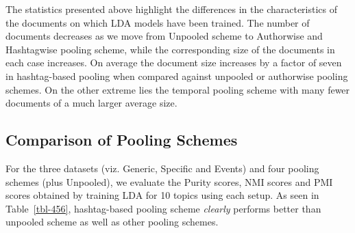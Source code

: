 \documentclass{sig-alternate}
\newcommand{\secmoveup}{\vspace{-1.mm}}
\begin{document}
The statistics presented above highlight the differences in the
characteristics of the documents on which LDA models have been
trained. The number of documents decreases as we move from Unpooled
scheme to Authorwise and Hashtagwise pooling scheme, while the
corresponding size of the documents in each case increases. On 
average the document size increases by a factor of seven in
hashtag-based pooling when compared against unpooled or authorwise
pooling schemes. On the other extreme lies the temporal pooling scheme
with many fewer documents of a much larger average size.

\secmoveup
\subsection{Comparison of Pooling Schemes}

For the three datasets (viz. Generic, Specific and Events) and four pooling
schemes (plus Unpooled), we evaluate the Purity scores, NMI scores and PMI scores
obtained by training LDA for 10 topics using each setup.
As seen in Table~\ref{tbl-456}, hashtag-based pooling scheme
\emph{clearly} performs better than unpooled scheme as well as other
pooling schemes.
\end{document}
